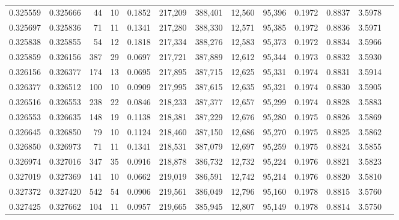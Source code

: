 \begin{tabular}{rrrrrrrrrrrrr}
0.325559 & 0.325666 &    44 &  10 &                                     0.1852 & 217,209 & 388,401 &  12,560 &  95,396 & 0.1972 & 0.8837 & 3.5978 \\
0.325697 & 0.325836 &    71 &  11 &                                     0.1341 & 217,280 & 388,330 &  12,571 &  95,385 & 0.1972 & 0.8836 & 3.5971 \\
0.325838 & 0.325855 &    54 &  12 &                                     0.1818 & 217,334 & 388,276 &  12,583 &  95,373 & 0.1972 & 0.8834 & 3.5966 \\
0.325859 & 0.326156 &   387 &  29 &                                     0.0697 & 217,721 & 387,889 &  12,612 &  95,344 & 0.1973 & 0.8832 & 3.5930 \\
0.326156 & 0.326377 &   174 &  13 &                                     0.0695 & 217,895 & 387,715 &  12,625 &  95,331 & 0.1974 & 0.8831 & 3.5914 \\
0.326377 & 0.326512 &   100 &  10 &                                     0.0909 & 217,995 & 387,615 &  12,635 &  95,321 & 0.1974 & 0.8830 & 3.5905 \\
0.326516 & 0.326553 &   238 &  22 &                                     0.0846 & 218,233 & 387,377 &  12,657 &  95,299 & 0.1974 & 0.8828 & 3.5883 \\
0.326553 & 0.326635 &   148 &  19 &                                     0.1138 & 218,381 & 387,229 &  12,676 &  95,280 & 0.1975 & 0.8826 & 3.5869 \\
0.326645 & 0.326850 &    79 &  10 &                                     0.1124 & 218,460 & 387,150 &  12,686 &  95,270 & 0.1975 & 0.8825 & 3.5862 \\
0.326850 & 0.326973 &    71 &  11 &                                     0.1341 & 218,531 & 387,079 &  12,697 &  95,259 & 0.1975 & 0.8824 & 3.5855 \\
0.326974 & 0.327016 &   347 &  35 &                                     0.0916 & 218,878 & 386,732 &  12,732 &  95,224 & 0.1976 & 0.8821 & 3.5823 \\
0.327019 & 0.327369 &   141 &  10 &                                     0.0662 & 219,019 & 386,591 &  12,742 &  95,214 & 0.1976 & 0.8820 & 3.5810 \\
0.327372 & 0.327420 &   542 &  54 &                                     0.0906 & 219,561 & 386,049 &  12,796 &  95,160 & 0.1978 & 0.8815 & 3.5760 \\
0.327425 & 0.327662 &   104 &  11 &                                     0.0957 & 219,665 & 385,945 &  12,807 &  95,149 & 0.1978 & 0.8814 & 3.5750 \\

\end{tabular}
